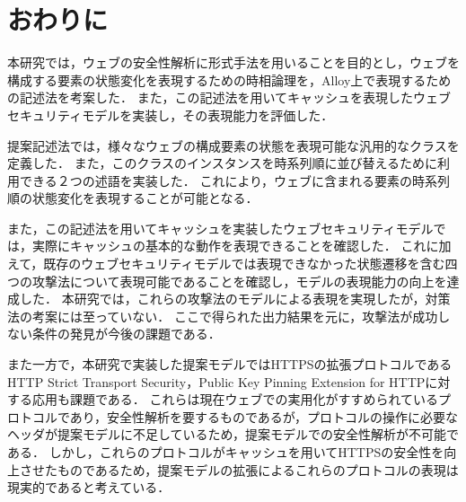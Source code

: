 \documentclass[12pt,a4paper]{jbook}
\begin{document}
\newpage

\chapter{おわりに}
本研究では，ウェブの安全性解析に形式手法を用いることを目的とし，ウェブを構成する要素の状態変化を表現するための時相論理を，Alloy上で表現するための記述法を考案した．
また，この記述法を用いてキャッシュを表現したウェブセキュリティモデルを実装し，その表現能力を評価した．

提案記述法では，様々なウェブの構成要素の状態を表現可能な汎用的なクラスを定義した．
また，このクラスのインスタンスを時系列順に並び替えるために利用できる２つの述語を実装した．
これにより，ウェブに含まれる要素の時系列順の状態変化を表現することが可能となる．

また，この記述法を用いてキャッシュを実装したウェブセキュリティモデルでは，実際にキャッシュの基本的な動作を表現できることを確認した．
これに加えて，既存のウェブセキュリティモデルでは表現できなかった状態遷移を含む四つの攻撃法について表現可能であることを確認し，モデルの表現能力の向上を達成した．
本研究では，これらの攻撃法のモデルによる表現を実現したが，対策法の考案には至っていない．
ここで得られた出力結果を元に，攻撃法が成功しない条件の発見が今後の課題である．

また一方で，本研究で実装した提案モデルではHTTPSの拡張プロトコルであるHTTP Strict Transport Security\cite{hsts}，Public Key Pinning Extension for HTTP\cite{hpkp}に対する応用も課題である．
これらは現在ウェブでの実用化がすすめられているプロトコルであり，安全性解析を要するものであるが，プロトコルの操作に必要なヘッダが提案モデルに不足しているため，提案モデルでの安全性解析が不可能である．
しかし，これらのプロトコルがキャッシュを用いてHTTPSの安全性を向上させたものであるため，提案モデルの拡張によるこれらのプロトコルの表現は現実的であると考えている．
\end{document}
